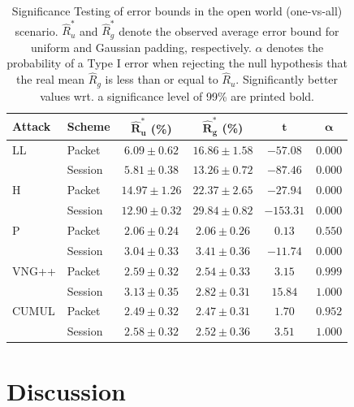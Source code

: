 \documentclass[
	ruledheaders=chapter,
	class=report,
	thesis={type=master, department=inf},
	accentcolor=1c,
	custommargins=true,
	marginpar=false,
	parskip=half-,
	fontsize=11pt,
]{tudapub}
\begin{document}
	\begin{table}
		\centering
		\small
		\begin{tabular}{llcccc}
			\toprule \textbf{Attack} & \textbf{Scheme} & $\mathbf{\widehat{R}^*_u}$ \textbf{(\%)} & $\mathbf{\widehat{R}^*_g}$  \textbf{(\%)} & $\mathbf{t}$ & $\mathbf{\alpha}$ \\
			\midrule LL & Packet & $6.09 \pm 0.62$ & $\mathbf{16.86 \pm 1.58}$ & $-57.08$ & $0.000$\\
			& Session & $5.81 \pm 0.38$ & $\mathbf{13.26 \pm 0.72}$ & $-87.46$ &  $0.000$\\ \addlinespace
			H & Packet & $14.97 \pm 1.26$ & $\mathbf{22.37 \pm 2.65}$ & $-27.94$ & $0.000$ \\
			& Session & $12.90 \pm 0.32$ & $\mathbf{29.84 \pm 0.82}$ & $-153.31$ & $0.000$ \\ \addlinespace
			P & Packet & $2.06 \pm 0.24$ & $2.06 \pm 0.26$ & $0.13$ & $0.550$ \\
			& Session & $3.04 \pm 0.33$ & $\mathbf{3.41 \pm 0.36}$ & $-11.74$ & $0.000$ \\ \addlinespace
			VNG++ & Packet & $\mathbf{2.59 \pm 0.32}$ & $2.54 \pm 0.33$ & $3.15$ & $0.999$ \\
			& Session & $\mathbf{3.13 \pm 0.35}$ & $2.82 \pm 0.31$ & $15.84$ & $1.000$ \\ \addlinespace
			CUMUL & Packet & $2.49\pm 0.32$ & $2.47 \pm 0.31$ & $1.70$ & $0.952$\\
			& Session & $\mathbf{2.58 \pm 0.32}$ & $2.52 \pm 0.36$ & $3.51$ & $1.000$ \\
			\bottomrule
		\end{tabular}
		\caption[Significance Testing of error bounds in the open world scenario]{Significance Testing of error bounds in the open world (one-vs-all) scenario. $\widehat{R}^*_u$ and $\widehat{R}^*_g$ denote the observed average error bound for uniform and Gaussian padding, respectively. $\alpha$ denotes the probability of a Type I error when rejecting the null hypothesis that the real mean $\widehat{R}_g$ is less than or equal to $\widehat{R}_u$. Significantly better values wrt. a significance level of 99\% are printed bold. }
		\label{tbl:sig_bound_ow}
	\end{table}

	\chapter{Discussion}
	\label{discussion}
\end{document}
